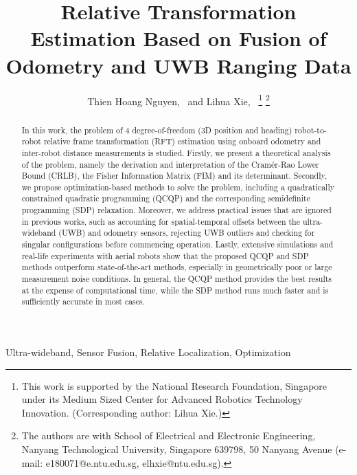 \documentclass[journal]{IEEEtran}
\title{Relative Transformation Estimation Based on Fusion of Odometry and UWB Ranging Data}
\author{Thien Hoang Nguyen,~\IEEEmembership{Student Member,~IEEE}
        and Lihua Xie,~\IEEEmembership{Fellow,~IEEE}
\thanks{This work is supported by the National Research Foundation, Singapore under its Medium Sized Center for Advanced Robotics Technology Innovation. (Corresponding author: Lihua Xie.)}
\thanks{The authors are with School of Electrical and Electronic Engineering, Nanyang Technological University, Singapore 639798, 50 Nanyang Avenue (e-mail: e180071@e.ntu.edu.sg, elhxie@ntu.edu.sg).}
}
\begin{document}

\maketitle

\begin{abstract}
In this work, the problem of 4 degree-of-freedom (3D position and heading) robot-to-robot relative frame transformation (RFT) estimation using onboard odometry and inter-robot distance measurements is studied. Firstly, we present a theoretical analysis of the problem, namely the derivation and interpretation of the Cramér-Rao Lower Bound (CRLB), the Fisher Information Matrix (FIM) and its determinant. Secondly, we propose optimization-based methods to solve the problem, including a quadratically constrained quadratic programming (QCQP) and the corresponding semidefinite programming (SDP) relaxation. Moreover, we address practical issues that are ignored in previous works, such as accounting for spatial-temporal offsets between the ultra-wideband (UWB) and odometry sensors, rejecting UWB outliers and checking for singular configurations before commencing operation. Lastly, extensive simulations and real-life experiments with aerial robots show that the proposed QCQP and SDP methods outperform state-of-the-art methods, especially in geometrically poor or large measurement noise conditions. In general, the QCQP method provides the best results at the expense of computational time, while the SDP method runs much faster and is sufficiently accurate in most cases. 
\end{abstract}

\begin{IEEEkeywords}
    Ultra-wideband, Sensor Fusion, Relative Localization, Optimization
\end{IEEEkeywords}
\end{document}
